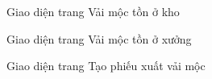 \begin{figure}[H]
    \begin{center}
        \caption{Giao diện trang Vải mộc tồn ở kho}
        \label{result_moc_ton_kho}
    \end{center}
\end{figure}

\begin{figure}[H]
    \begin{center}
        \caption{Giao diện trang Vải mộc tồn ở xưởng}
        \label{result_moc_ton_xuong}
    \end{center}
\end{figure}

\begin{figure}[H]
    \begin{center}
        \caption{Giao diện trang Tạo phiếu xuất vải mộc}
        \label{result_tao_phieu_xuat}
    \end{center}
\end{figure}

